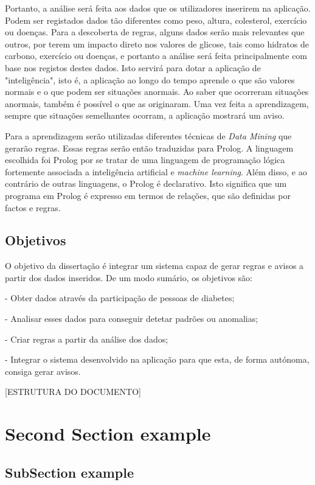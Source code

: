 Portanto, a análise será feita aos dados que os utilizadores inserirem na aplicação. Podem ser registados dados tão diferentes como peso, altura, colesterol, exercício ou doenças. Para a descoberta de regras, alguns dados serão mais relevantes que outros, por terem um impacto direto nos valores de glicose, tais como hidratos de carbono, exercício ou doenças, e portanto a análise será feita principalmente com base nos registos destes dados. Isto servirá para dotar a aplicação de "inteligência", isto é, a aplicação ao longo do tempo aprende o que são valores normais e o que podem ser situações anormais. Ao saber que ocorreram situações anormais, também é possível o que as originaram. Uma vez feita a aprendizagem, sempre que situações semelhantes ocorram, a aplicação mostrará um aviso.

Para a aprendizagem serão utilizadas diferentes técnicas de \textit{Data Mining} que gerarão regras. Essas regras serão então traduzidas para Prolog. A linguagem escolhida foi Prolog por se tratar de uma linguagem de programação lógica fortemente associada a inteligência artificial e \textit{machine learning}. Além disso, e ao contrário de outras linguagens, o Prolog é declarativo. Isto significa que um programa em Prolog é expresso em termos de relações, que são definidas por factos e regras.

\subsection{Objetivos}

O objetivo da dissertação é integrar um sistema capaz de gerar regras e avisos a partir dos dados inseridos. De um modo sumário, os objetivos são:

- Obter dados através da participação de pessoas de diabetes;

- Analisar esses dados para conseguir detetar padrões ou anomalias;

- Criar regras a partir da análise dos dados;

- Integrar o sistema desenvolvido na aplicação para que esta, de forma autónoma, consiga gerar avisos.

[ESTRUTURA DO DOCUMENTO]
\section{Second Section example}
\subsection{SubSection example}
\lipsum[7-10]

